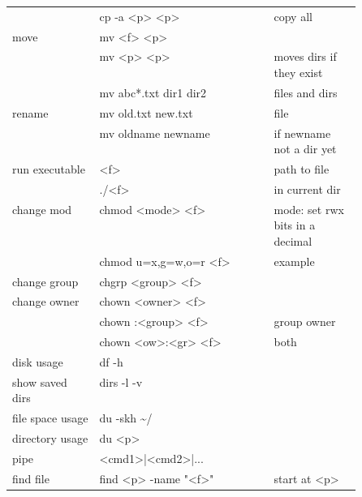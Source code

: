 {\begin{tabularx}{\linewidth}{@{} p{0.25\linewidth}>{\ttfamily}lp{0.25\linewidth} @{}}
                             & cp -a <p> <p>              & copy all                         \\
        move                 & mv <f> <p>                 &                                  \\
                             & mv <p> <p>                 & moves dirs if they exist         \\
                             & mv abc*.txt dir1 dir2      & files and dirs                   \\
        rename               & mv old.txt new.txt         & file                             \\
                             & mv oldname newname         & if newname not a dir yet         \\
        run executable       & <f>                        & path to file                     \\
                             & ./<f>                      & in current dir                   \\
        change mod           & chmod <mode> <f>           & mode: set rwx bits in a decimal  \\
                             & chmod u=x,g=w,o=r <f>      & example                          \\
        change group         & chgrp <group> <f>          &                                  \\
        change owner         & chown <owner> <f>          &                                  \\
                             & chown :<group> <f>         & group owner                      \\
                             & chown <ow>:<gr> <f>        & both                             \\
        disk usage           & df -h                      &                                  \\
        show saved dirs      & dirs -l -v                 &                                  \\
        file space usage     & du -skh \textasciitilde{}/ &                                  \\
        directory usage      & du <p>                     &                                  \\
        pipe                 & <cmd1>|<cmd2>|...          &                                  \\
        find file            & find <p> -name "<f>"       & start at <p>                     \\

\end{tabularx}}
